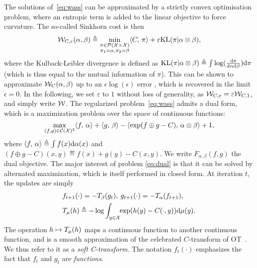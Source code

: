 The solutions of~\eqref{eq:wass} can be approximated by a strictly convex optimisation problem, where an entropic term is added to the linear objective to force curvature. The so-called Sinkhorn cost is then
\begin{equation}\label{eq:wass}
    \mathcal{W}_{C,\varepsilon}(\alpha, \beta) \triangleq 
    \min_{
    \substack{
        \pi \in \mathcal{P}(\mathcal{X} \times \mathcal{X})
        \\\pi_1 = \alpha, \pi_2 = \beta
    }    
    } \langle C,\,\pi\rangle + \varepsilon \textrm{KL}(\pi | \alpha \otimes \beta),
\end{equation}
where the Kulback-Leibler divergence is defined as $\textrm{KL}(\pi | \alpha \otimes
\beta) \triangleq \int \log(\frac{\textrm{d}\pi}{\textrm{d}\alpha\textrm{d}\beta}) \textrm{d}\pi$ (which is thus equal to
the mutual information of $\pi$).
%
This can be shown to approximate $\mathcal{W}_C(\alpha,\beta)$  up to an $\epsilon
\log(\epsilon)$ error \citep{2019-Genevay-aistats}, which is recovered in the
limit $\epsilon=0$. In the following, we set $\varepsilon$ to $1$ without loss
of generality, as  $\mathcal{W}_{C, \varepsilon} = \varepsilon \mathcal{W}_{C, 1}$, and simply write $\mathcal{W}$.
%
The regularized problem~\eqref{eq:wass} admits a dual form, which is a maximization problem over the space of continuous functions:
\begin{equation}\label{eq:dual}
    \max_{(f, g) \in \mathcal{C}(\mathcal{X})^2} \langle f,\,\alpha\rangle + \langle g,\,\beta\rangle
    - \langle \exp(f \oplus g - C),\,\alpha \otimes \beta\rangle + 1, 
\end{equation}
where $\langle f,\,\alpha\rangle \triangleq \int f(x) \textrm{d}\alpha(x)$ and $(f \oplus g - C)(x,y)
\eqdef f(x)+g(y)-C(x,y)$. We write $F_{\alpha, \beta}(f, g)$ the dual objective. 
The major interest of problem \eqref{eq:dual} is that it can be solved by alternated maximization, which is itself performed in closed form. At iteration $t$, the updates are simply
\begin{align}
    &f_{t+1}(\cdot) = - T_{\beta}(g_t), \:
    g_{t+1}(\cdot) = - T_{\alpha}(f_{t+1}), \\
    &
    T_{\mu}(h) \triangleq 
    - \log \int_{y \in \mathcal{X}}\!\! \exp(h(y) - C(\cdot, y))\textrm{d} \mu(y).\label{eq:sinkhorn}
\end{align}
The operation $h \mapsto T_{\mu}(h)$  maps a continuous function to another continuous function, and is a smooth approximation of the celebrated $C$-transform of OT~\cite{santambrogio2015optimal}. We thus refer to it as a \textit{soft C-transform}. 
%
The notation $f_t(\cdot)$ emphasizes the fact that $f_t$ and $g_t$ are \textit{functions}. 
%

